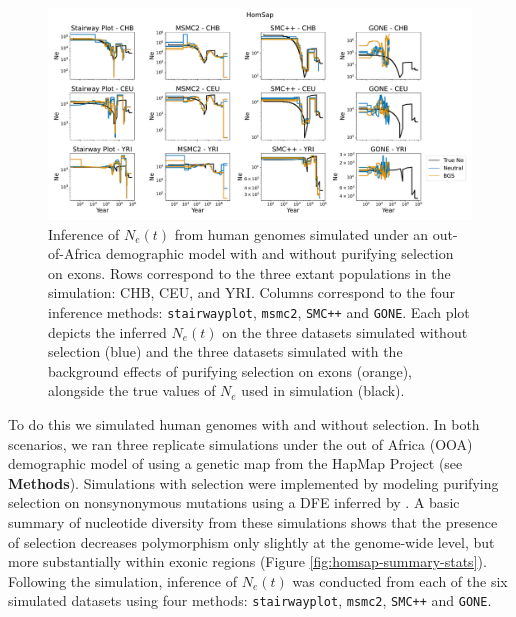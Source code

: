\documentclass[hidelinks]{article}
\newcommand{\msmc}{\texttt{msmc2}\xspace}
\newcommand{\stairway}{\texttt{stairwayplot}\xspace}
\newcommand{\gone}{\texttt{GONE}\xspace}
\newcommand{\smcpp}{\texttt{SMC++}\xspace}
\begin{document}
    \begin{figure}[b!]
        \centering
        \includegraphics[width=\textwidth]{figures/HomSap/OOA/estimated_Ne_t_final}
        \caption{
        \label{fig:human-demography}
        Inference of $N_e(t)$ from human genomes simulated under an out-of-Africa demographic model
        with and without purifying selection on exons.
        Rows correspond to the three extant populations in the simulation: CHB, CEU, and YRI.
        Columns correspond to the four inference methods:
        \stairway, \msmc, \smcpp and \gone.
        Each plot depicts the inferred $N_e(t)$ on the three datasets simulated without selection (blue)
        and the three datasets simulated with the background effects of purifying selection on exons (orange),
        alongside the true values of $N_e$ used in simulation (black).
        }
    \end{figure}

    To do this we simulated human genomes with and without selection.
    In both scenarios, we ran three replicate simulations
    under the out of Africa (OOA) demographic model of
    \citet{ragsdale2019models} using a genetic map from the HapMap Project \citep{international2007second} (see \textbf{Methods}).
    Simulations with selection were implemented by modeling purifying selection on nonsynonymous mutations
    using a DFE inferred by \citet{kim2017inference}.
    A basic summary of nucleotide diversity from these simulations
    shows that the presence of selection decreases polymorphism only slightly
    at the genome-wide level, but more substantially within exonic regions (Figure \ref{fig:homsap-summary-stats}).
    Following the simulation, inference of $N_e(t)$ was conducted from each of the six simulated datasets using four methods:
    \stairway \citep{liu2020stairway}, \msmc \citep{Schiffels2020}, \smcpp \citep{terhorst2017robust} and \gone \citep{santiago2020recent}.
\end{document}
